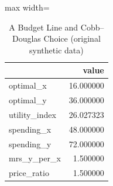 \begin{table}[htbp]
\centering
\caption{A Budget Line and Cobb–Douglas Choice (original synthetic data)}
\begingroup
\small
\setlength{\tabcolsep}{6pt}
\renewcommand{\arraystretch}{1.12}
\begin{adjustbox}{max width=\linewidth}
\begin{tabular}{@{}lr@{}}
\toprule
 & value \\
\midrule
optimal\_x & 16.000000 \\
optimal\_y & 36.000000 \\
utility\_index & 26.027323 \\
spending\_x & 48.000000 \\
spending\_y & 72.000000 \\
mrs\_y\_per\_x & 1.500000 \\
price\_ratio & 1.500000 \\
\bottomrule
\end{tabular}
\end{adjustbox}
\endgroup
\end{table}